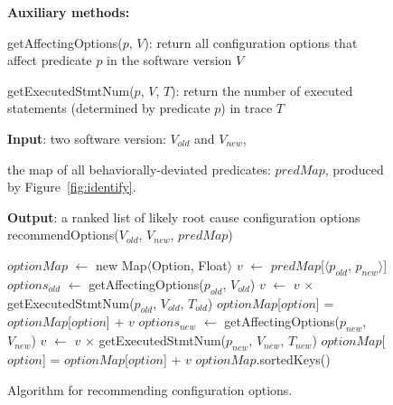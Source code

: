 
\begin{figure}[t]
\textbf{Auxiliary methods:}

\quad getAffectingOptions($\mathit{p}$, $\mathit{V}$): return all configuration options that affect predicate $\mathit{p}$ in the software version $\mathit{V}$

\quad getExecutedStmtNum($\mathit{p}$, $\mathit{V}$, $\mathit{T}$): return the number of executed statements (determined by predicate $\mathit{p}$) in trace $\mathit{T}$

\textbf{Input}: two software version: $\mathit{V_{old}}$ and $\mathit{V_{new}}$, 

\quad the map of all behaviorally-deviated predicates: $\mathit{predMap}$, produced by Figure~\ref{fig:identify}.

\textbf{Output}: {a ranked list of likely root cause configuration options}
\vspace{-4mm}%
recommendOptions($\mathit{V_{old}}$, $\mathit{V_{new}}$, $\mathit{predMap}$)\\
\begin{algorithmic}[1]
\STATE $\mathit{optionMap}$ $\leftarrow$ new Map$\langle$Option, Float$\rangle$
\STATE $\mathit{v}$ $\leftarrow$ $\mathit{predMap}$[$\langle$$\mathit{p_{old}}$, $\mathit{p_{new}}$$\rangle$]
\STATE $\mathit{options_{old}}$ $\leftarrow$ getAffectingOptions($\mathit{p_{old}}$, $\mathit{V_{old}}$)
\STATE $\mathit{v}$ $\leftarrow$ $\mathit{v}$ $\times$ getExecutedStmtNum($\mathit{p_{old}}$, $\mathit{V_{old}}$, $\mathit{T_{old}}$)
\STATE $\mathit{optionMap}$[$\mathit{option}$] = $\mathit{optionMap}$[$\mathit{option}$] + $\mathit{v}$
\ENDFOR
\ENDIF
{}
\STATE $\mathit{options_{new}}$ $\leftarrow$ getAffectingOptions($\mathit{p_{new}}$, $\mathit{V_{new}}$)
\STATE $\mathit{v}$ $\leftarrow$ $\mathit{v}$ $\times$ getExecutedStmtNum($\mathit{p_{new}}$, $\mathit{V_{new}}$, $\mathit{T_{new}}$)
\STATE $\mathit{optionMap}$[$\mathit{option}$] = $\mathit{optionMap}$[$\mathit{option}$] + $\mathit{v}$
\ENDFOR
\ENDIF
\ENDFOR
\RETURN $\mathit{optionMap}$.sortedKeys()
\vspace{-2mm}
\end{algorithmic}
\caption{Algorithm for recommending configuration options.
\label{fig:recommend}
}
\end{figure}

